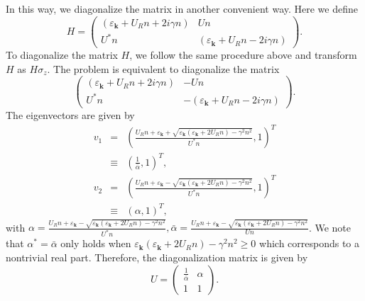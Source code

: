 \documentclass[aps,onecolumn,superscriptaddress,notitlepage,longbibliography]{revtex4-1}
\newcommand{\tmmathbf}[1]{\ensuremath{\boldsymbol{#1}}}
\begin{document}
In this way, we diagonalize the matrix in another convenient way. Here we
define
\begin{equation}
  H = \left(\begin{array}{cc}
    (\varepsilon_{\tmmathbf{k}} + U_R n + 2 i \gamma n) & U n\\
    U^{\ast} n & (\varepsilon_{\tmmathbf{k}} + U_R n - 2 i \gamma n)
  \end{array}\right) .
\end{equation}
To diagonalize the matrix $H$, we follow the same procedure above and
transform $H$ as $H \sigma_z$. The problem is equivalent to diagonalize the
matrix
\begin{equation}
  \left(\begin{array}{cc}
    (\varepsilon_{\tmmathbf{k}} + U_R n + 2 i \gamma n) & - U n\\
    U^{\ast} n & - (\varepsilon_{\tmmathbf{k}} + U_R n - 2 i \gamma n)
  \end{array}\right) .
\end{equation}
The eigenvectors are given by
\begin{eqnarray}
  v_1 & = & \left( \frac{U_R n + \varepsilon_{\tmmathbf{k}} +
  \sqrt{\varepsilon_{\tmmathbf{k}} (\varepsilon_{\tmmathbf{k}} + 2 U_R n) -
  \gamma^2 n^2}}{U^{\ast} n}, 1 \right)^T \nonumber\\
  & \equiv & \left( \frac{1}{\bar{\alpha}}, 1 \right)^T, \\
  v_2 & = & \left( \frac{U_R n + \varepsilon_{\tmmathbf{k}} -
  \sqrt{\varepsilon_{\tmmathbf{k}} (\varepsilon_{\tmmathbf{k}} + 2 U_R n) -
  \gamma^2 n^2}}{U^{\ast} n}, 1 \right)^T \nonumber\\
  & \equiv & (\alpha, 1)^T, 
\end{eqnarray}
with $\alpha = \frac{U_R n + \varepsilon_{\tmmathbf{k}} -
\sqrt{\varepsilon_{\tmmathbf{k}} (\varepsilon_{\tmmathbf{k}} + 2 U_R n) -
\gamma^2 n^2}}{U^{\ast} n}, \bar{\alpha} = \frac{U_R n +
\varepsilon_{\tmmathbf{k}} - \sqrt{\varepsilon_{\tmmathbf{k}}
(\varepsilon_{\tmmathbf{k}} + 2 U_R n) - \gamma^2 n^2}}{U n}$. We note that
$\alpha^{\ast} = \bar{\alpha}$ only holds when $\varepsilon_{\tmmathbf{k}}
(\varepsilon_{\tmmathbf{k}} + 2 U_R n) - \gamma^2 n^2 \geqslant 0$ which
corresponds to a nontrivial real part. Therefore, the diagonalization matrix
is given by
\begin{equation}
  U = \left(\begin{array}{cc}
    \frac{1}{\bar{\alpha}} & \alpha\\
    1 & 1
  \end{array}\right) .
\end{equation}
\end{document}
